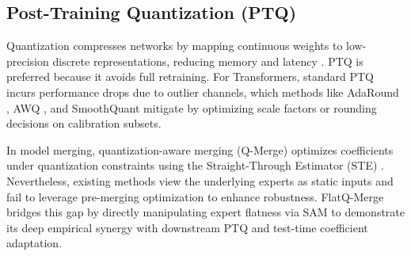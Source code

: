 \subsection{Post-Training Quantization (PTQ)}
Quantization compresses networks by mapping continuous weights to low-precision discrete representations, reducing memory and latency \cite{Jacob2018Quant}. PTQ is preferred because it avoids full retraining. For Transformers, standard PTQ incurs performance drops due to outlier channels, which methods like AdaRound \cite{Nagel2020AdaRound}, AWQ \cite{Lin2023AWQ}, and SmoothQuant \cite{Xiao2023SmoothQuant} mitigate by optimizing scale factors or rounding decisions on calibration subsets.

In model merging, quantization-aware merging (Q-Merge) \cite{Sterling2026QMerge} optimizes coefficients under quantization constraints using the Straight-Through Estimator (STE) \cite{Hubara2017Quantized}. Nevertheless, existing methods view the underlying experts as static inputs and fail to leverage pre-merging optimization to enhance robustness. FlatQ-Merge bridges this gap by directly manipulating expert flatness via SAM to demonstrate its deep empirical synergy with downstream PTQ and test-time coefficient adaptation.
